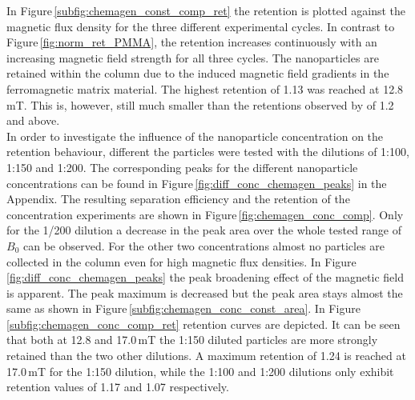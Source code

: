 In Figure\,\ref{subfig:chemagen_const_comp_ret} the retention is plotted against the magnetic flux density for the three different experimental cycles. In contrast to Figure\,\ref{fig:norm_ret_PMMA}, the retention increases continuously with an increasing magnetic field strength for all three cycles. The nanoparticles are retained within the column due to the induced magnetic field gradients in the ferromagnetic matrix material. The highest retention of 1.13 was reached at 12.8\,mT. This is, however, still much smaller than the retentions observed by \cite{AndreMaster} of 1.2 and above. \\
In order to investigate the influence of the nanoparticle concentration on the retention behaviour, different the particles were tested with the dilutions of 1:100, 1:150 and 1:200. The corresponding peaks for the different nanoparticle concentrations can be found in Figure\,\ref{fig:diff_conc_chemagen_peaks} in the Appendix. The resulting separation efficiency and the retention of the concentration experiments are shown in Figure\,\ref{fig:chemagen_conc_comp}. Only for the 1/200 dilution a decrease in the peak area over the whole tested range of $B_{0}$ can be observed. For the other two concentrations almost no particles are collected in the column even for high magnetic flux densities. In Figure\,\ref{fig:diff_conc_chemagen_peaks} the peak broadening effect of the magnetic field is apparent. The peak maximum is decreased but the peak area stays almost the same as shown in Figure\,\ref{subfig:chemagen_conc_const_area}. In Figure\,\ref{subfig:chemagen_conc_comp_ret} retention curves are depicted. It can be seen that both at 12.8 and 17.0\,mT the 1:150 diluted particles are more strongly retained than the two other dilutions. A maximum retention of 1.24 is reached at 17.0\,mT for the 1:150 dilution, while the 1:100 and 1:200 dilutions only exhibit retention values of 1.17 and 1.07 respectively. 

